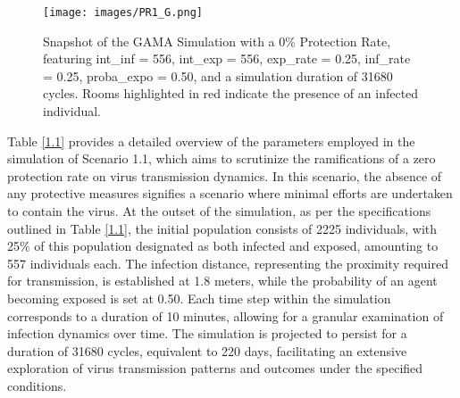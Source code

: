  	\begin{figure}[H]
	\centering
		\texttt{[image: images/PR1\_G.png]}
		\caption{Snapshot of the GAMA Simulation with a 0\% Protection Rate, featuring int\_inf = 556, int\_exp = 556, exp\_rate = 0.25, inf\_rate = 0.25, proba\_expo = 0.50, and a simulation duration of 31680 cycles. Rooms highlighted in red indicate the presence of an infected individual.}
		\label{PR1G}
	\end{figure}
Table \ref{1.1} provides a detailed overview of the parameters employed in the simulation of Scenario 1.1, which aims to scrutinize the ramifications of a zero protection rate on virus transmission dynamics. In this scenario, the absence of any protective measures signifies a scenario where minimal efforts are undertaken to contain the virus. At the outset of the simulation, as per the specifications outlined in Table \ref{1.1}, the initial population consists of 2225 individuals, with 25\% of this population designated as both infected and exposed, amounting to 557 individuals each. The infection distance, representing the proximity required for transmission, is established at 1.8 meters, while the probability of an agent becoming exposed is set at 0.50. Each time step within the simulation corresponds to a duration of 10 minutes, allowing for a granular examination of infection dynamics over time. The simulation is projected to persist for a duration of 31680 cycles, equivalent to 220 days, facilitating an extensive exploration of virus transmission patterns and outcomes under the specified conditions. 

